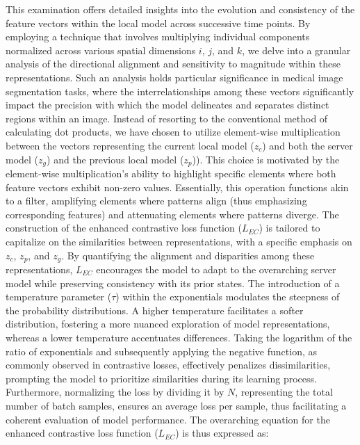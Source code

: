 This examination offers detailed insights into the evolution and consistency of the feature vectors within the local model across successive time points. By employing a technique that involves multiplying individual components normalized across various spatial dimensions \(i\), \(j\), and \(k\), we delve into a granular analysis of the directional alignment and sensitivity to magnitude within these representations. Such an analysis holds particular significance in medical image segmentation tasks, where the interrelationships among these vectors significantly impact the precision with which the model delineates and separates distinct regions within an image. Instead of resorting to the conventional method of calculating dot products, we have chosen to utilize element-wise multiplication between the vectors representing the current local model (\(z_c\)) and both the server model (\(z_g\)) and the previous local model (\(z_p\))). This choice is motivated by the element-wise multiplication's ability to highlight specific elements where both feature vectors exhibit non-zero values. Essentially, this operation functions akin to a filter, amplifying elements where patterns align (thus emphasizing corresponding features) and attenuating elements where patterns diverge. The construction of the enhanced contrastive loss function (\(L_{EC}\)) is tailored to capitalize on the similarities between representations, with a specific emphasis on \(z_c\), \(z_p\), and \(z_g\). By quantifying the alignment and disparities among these representations, \(L_{EC}\) encourages the model to adapt to the overarching server model while preserving consistency with its prior states. The introduction of a temperature parameter (\(\tau\)) within the exponentials modulates the steepness of the probability distributions. A higher temperature facilitates a softer distribution, fostering a more nuanced exploration of model representations, whereas a lower temperature accentuates differences. Taking the logarithm of the ratio of exponentials and subsequently applying the negative function, as commonly observed in contrastive losses, effectively penalizes dissimilarities, prompting the model to prioritize similarities during its learning process. Furthermore, normalizing the loss by dividing it by \(N\), representing the total number of batch samples, ensures an average loss per sample, thus facilitating a coherent evaluation of model performance. The overarching equation for the enhanced contrastive loss function (\(L_{EC}\)) is thus expressed as:


